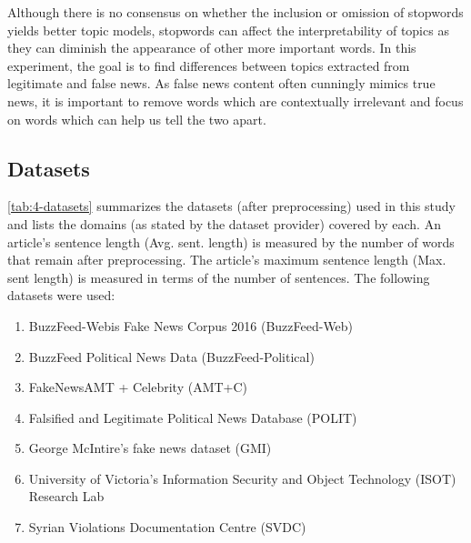 Although there is no consensus on whether the inclusion or omission of stopwords yields better topic models, stopwords can affect the interpretability of topics as they can diminish the appearance of other more important words. In this experiment, the goal is to find differences between topics extracted from legitimate and false news. As false news content often cunningly mimics true news, it is important to remove words which are contextually irrelevant and focus on words which can help us tell the two apart.

\subsection{Datasets}
\label{ssec:4-datasets}

\autoref{tab:4-datasets} summarizes the datasets (after preprocessing) used in this study and lists the domains (as stated by the dataset provider) covered by each. An article’s sentence length (Avg. sent. length) is measured by the number of words that remain after preprocessing. The article's maximum sentence length (Max. sent length) is measured in terms of the number of sentences. The following datasets were used:

\begin{enumerate}
  \item BuzzFeed-Webis Fake News Corpus 2016 (BuzzFeed-Web)
  \item BuzzFeed Political News Data (BuzzFeed-Political)
  \item FakeNewsAMT + Celebrity (AMT+C)
  \item Falsified and Legitimate Political News Database  (POLIT)
  \item George McIntire's fake news dataset (GMI)
  \item University of Victoria's Information Security and Object Technology (ISOT) Research Lab
  \item Syrian Violations Documentation Centre (SVDC)
\end{enumerate}

